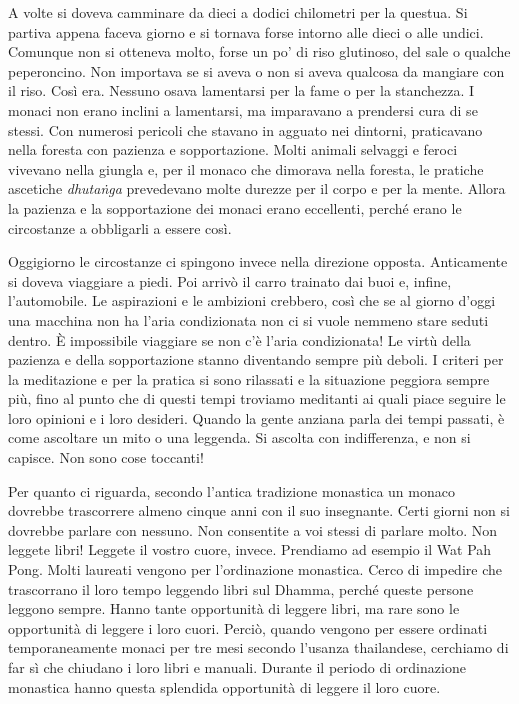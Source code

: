 A volte si doveva camminare da dieci a dodici chilometri per la questua.
Si partiva appena faceva giorno e si tornava forse intorno alle dieci o
alle undici. Comunque non si otteneva molto, forse un po' di riso
glutinoso, del sale o qualche peperoncino. Non importava se si aveva o
non si aveva qualcosa da mangiare con il riso. Così era. Nessuno osava
lamentarsi per la fame o per la stanchezza. I monaci non erano inclini a
lamentarsi, ma imparavano a prendersi cura di se stessi. Con numerosi
pericoli che stavano in agguato nei dintorni, praticavano nella foresta
con pazienza e sopportazione. Molti animali selvaggi e feroci vivevano
nella giungla e, per il monaco che dimorava nella foresta, le pratiche
ascetiche \emph{dhutaṅga} prevedevano molte durezze per il corpo e per
la mente. Allora la pazienza e la sopportazione dei monaci erano
eccellenti, perché erano le circostanze a obbligarli a essere così.

Oggigiorno le circostanze ci spingono invece nella direzione opposta.
Anticamente si doveva viaggiare a piedi. Poi arrivò il carro trainato
dai buoi e, infine, l'automobile. Le aspirazioni e le ambizioni
crebbero, così che se al giorno d'oggi una macchina non ha l'aria
condizionata non ci si vuole nemmeno stare seduti dentro. È impossibile
viaggiare se non c'è l'aria condizionata! Le virtù della pazienza e
della sopportazione stanno diventando sempre più deboli. I criteri per
la meditazione e per la pratica si sono rilassati e la situazione
peggiora sempre più, fino al punto che di questi tempi troviamo
meditanti ai quali piace seguire le loro opinioni e i loro desideri.
Quando la gente anziana parla dei tempi passati, è come ascoltare un
mito o una leggenda. Si ascolta con indifferenza, e non si capisce. Non
sono cose toccanti!

Per quanto ci riguarda, secondo l'antica tradizione monastica un monaco
dovrebbe trascorrere almeno cinque anni con il suo insegnante. Certi
giorni non si dovrebbe parlare con nessuno. Non consentite a voi stessi
di parlare molto. Non leggete libri! Leggete il vostro cuore, invece.
Prendiamo ad esempio il Wat Pah Pong. Molti laureati vengono per
l'ordinazione monastica. Cerco di impedire che trascorrano il loro tempo
leggendo libri sul Dhamma, perché queste persone leggono sempre. Hanno
tante opportunità di leggere libri, ma rare sono le opportunità di
leggere i loro cuori. Perciò, quando vengono per essere ordinati
temporaneamente monaci per tre mesi secondo l'usanza thailandese,
cerchiamo di far sì che chiudano i loro libri e manuali. Durante il
periodo di ordinazione monastica hanno questa splendida opportunità di
leggere il loro cuore.


